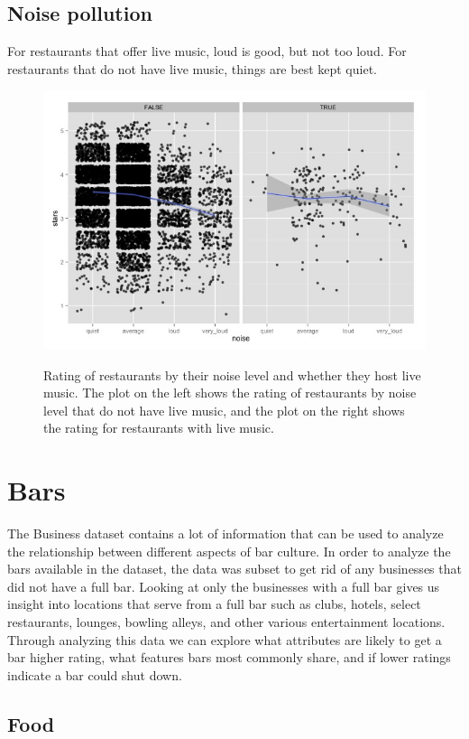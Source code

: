 \documentclass[11pt]{article}
\begin{document}
\subsection{Noise pollution}

For restaurants that offer live music, loud is good, but not too loud. For restaurants that do not have live music, things are best kept quiet.

\begin{figure}[h]
\caption{Rating of restaurants by their noise level and whether they host live music. The plot on the left shows the rating of restaurants by noise level that do not have live music, and the plot on the right shows the rating for restaurants with live music.}
\centering
\includegraphics[width=0.6\linewidth]{Figures/food_noise.jpeg}
\label{fig:food_noise}
\end{figure}



\section{Bars}

The Business dataset contains a lot of information that can be used to analyze the relationship between different aspects of bar culture.  In order to analyze the bars available in the dataset, the data was subset to get rid of any businesses that did not have a full bar.  Looking at only the businesses with a full bar gives us insight into locations that serve from a full bar such as clubs, hotels, select restaurants, lounges, bowling alleys, and other various entertainment locations.  Through analyzing this data we can explore what attributes are likely to get a bar higher rating, what features bars most commonly share, and if lower ratings indicate a bar   
could shut down.

\subsection{Food}
\end{document}
